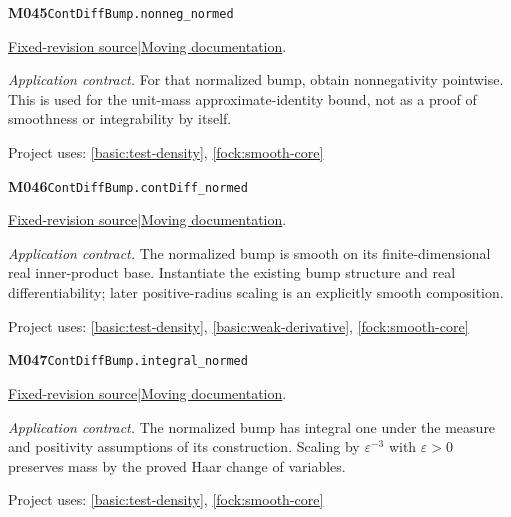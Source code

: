 \documentclass[11pt,a4paper]{article}
\theoremstyle{definition}
\theoremstyle{remark}
\begin{document}
\noindent\textbf{M045}\label{base:M045}\quad\nolinkurl{ContDiffBump.nonneg_normed}

\href{https://github.com/leanprover-community/mathlib4/blob/9bac2d0692944a775113f7c130fd5e5b4608a854/Mathlib/Analysis/Calculus/BumpFunction/Normed.lean}{Fixed-revision source}\quad|\quad\href{https://leanprover-community.github.io/mathlib4_docs/Mathlib/Analysis/Calculus/BumpFunction/Normed.html#ContDiffBump.nonneg_normed}{Moving documentation}.\par
\noindent\textit{Application contract.} For that normalized bump, obtain nonnegativity pointwise. This is used for the unit-mass approximate-identity bound, not as a proof of smoothness or integrability by itself.\par
{\small Project uses: \ref{basic:test-density}, \ref{fock:smooth-core}}\par\medskip

\noindent\textbf{M046}\label{base:M046}\quad\nolinkurl{ContDiffBump.contDiff_normed}

\href{https://github.com/leanprover-community/mathlib4/blob/9bac2d0692944a775113f7c130fd5e5b4608a854/Mathlib/Analysis/Calculus/BumpFunction/Normed.lean}{Fixed-revision source}\quad|\quad\href{https://leanprover-community.github.io/mathlib4_docs/Mathlib/Analysis/Calculus/BumpFunction/Normed.html#ContDiffBump.contDiff_normed}{Moving documentation}.\par
\noindent\textit{Application contract.} The normalized bump is smooth on its finite-dimensional real inner-product base. Instantiate the existing bump structure and real differentiability; later positive-radius scaling is an explicitly smooth composition.\par
{\small Project uses: \ref{basic:test-density}, \ref{basic:weak-derivative}, \ref{fock:smooth-core}}\par\medskip

\noindent\textbf{M047}\label{base:M047}\quad\nolinkurl{ContDiffBump.integral_normed}

\href{https://github.com/leanprover-community/mathlib4/blob/9bac2d0692944a775113f7c130fd5e5b4608a854/Mathlib/Analysis/Calculus/BumpFunction/Normed.lean}{Fixed-revision source}\quad|\quad\href{https://leanprover-community.github.io/mathlib4_docs/Mathlib/Analysis/Calculus/BumpFunction/Normed.html#ContDiffBump.integral_normed}{Moving documentation}.\par
\noindent\textit{Application contract.} The normalized bump has integral one under the measure and positivity assumptions of its construction. Scaling by $\varepsilon^{-3}$ with $\varepsilon>0$ preserves mass by the proved Haar change of variables.\par
{\small Project uses: \ref{basic:test-density}, \ref{fock:smooth-core}}\par\medskip
\end{document}
